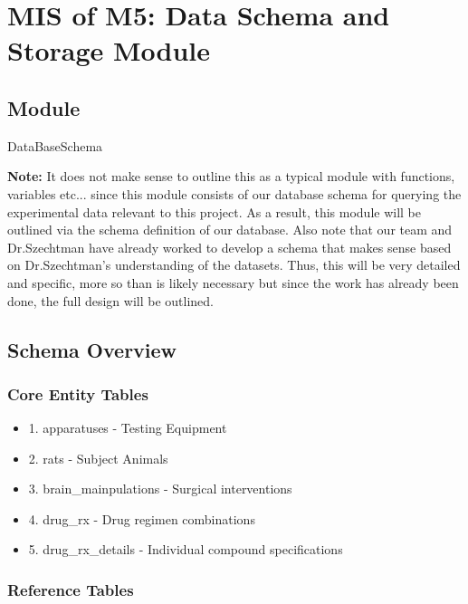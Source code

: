 \documentclass[12pt, titlepage]{article}
\begin{document}
\section{MIS of M5: Data Schema and Storage Module} \label{Module 5}

\subsection{Module}

DataBaseSchema \\

\par{\textbf{Note: }It does not make sense to outline this as a typical module with functions, variables etc... since this module consists of our database schema
	for querying the experimental data relevant to this project. As a result, this module will be outlined via the schema definition of our database.
  Also note that our team and Dr.Szechtman have already worked to develop a schema that makes sense based on Dr.Szechtman's understanding of the datasets.
  Thus, this will be very detailed and specific, more so than is likely necessary but since the work has already been done, the full design will be
  outlined.}

\subsection{Schema Overview}

\subsubsection{Core Entity Tables}

\begin{itemize}

	\item{1. apparatuses - Testing Equipment}
	\item{2. rats - Subject Animals}
	\item{3. brain\_mainpulations - Surgical interventions}
	\item{4. drug\_rx - Drug regimen combinations}
	\item{5. drug\_rx\_details - Individual compound specifications}

\end{itemize}

\subsubsection{Reference Tables}
\end{document}
